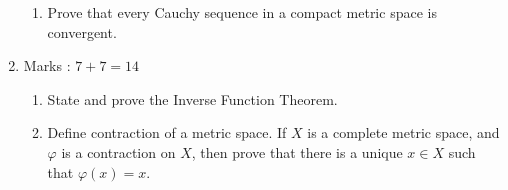 \documentclass[../main-sheet.tex]{subfiles}
\begin{document}
\begin{enumerate}
\begin{enumerate}
                  \item Prove that every Cauchy sequence in a compact metric space is convergent.
            \end{enumerate}
        \item Marks : $ 7+7=14 $
              \begin{enumerate}
                  \item State and prove the Inverse Function Theorem.
                  \item Define contraction of a metric space. If $ X $ is a complete metric space, and $ \varphi $ is a contraction on $ X $, then prove that there is a unique $ x \in X $ such that $ \varphi(x) = x $. 
            \end{enumerate}
\end{enumerate}
\end{document}
